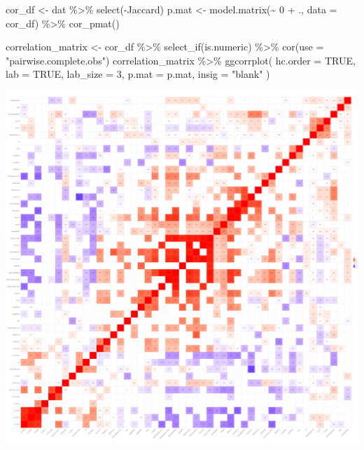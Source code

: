 \documentclass[
  letterpaper,
  DIV=11,
  numbers=noendperiod]{scrartcl}
\newenvironment{Shaded}{\begin{snugshade}}{\end{snugshade}}
\newcommand{\AttributeTok}[1]{\textcolor[rgb]{0.40,0.45,0.13}{#1}}
\newcommand{\ConstantTok}[1]{\textcolor[rgb]{0.56,0.35,0.01}{#1}}
\newcommand{\DecValTok}[1]{\textcolor[rgb]{0.68,0.00,0.00}{#1}}
\newcommand{\FunctionTok}[1]{\textcolor[rgb]{0.28,0.35,0.67}{#1}}
\newcommand{\NormalTok}[1]{\textcolor[rgb]{0.00,0.23,0.31}{#1}}
\newcommand{\OtherTok}[1]{\textcolor[rgb]{0.00,0.23,0.31}{#1}}
\newcommand{\SpecialCharTok}[1]{\textcolor[rgb]{0.37,0.37,0.37}{#1}}
\newcommand{\StringTok}[1]{\textcolor[rgb]{0.13,0.47,0.30}{#1}}
\begin{document}
\begin{Shaded}
\begin{Highlighting}[]
\NormalTok{cor\_df }\OtherTok{\textless{}{-}}\NormalTok{ dat }\SpecialCharTok{\%\textgreater{}\%} \FunctionTok{select}\NormalTok{(}\SpecialCharTok{{-}}\NormalTok{Jaccard)}
\NormalTok{p.mat }\OtherTok{\textless{}{-}} \FunctionTok{model.matrix}\NormalTok{(}\SpecialCharTok{\textasciitilde{}} \DecValTok{0} \SpecialCharTok{+}\NormalTok{ ., }\AttributeTok{data =}\NormalTok{ cor\_df) }\SpecialCharTok{\%\textgreater{}\%}
    \FunctionTok{cor\_pmat}\NormalTok{()}

\NormalTok{correlation\_matrix }\OtherTok{\textless{}{-}}\NormalTok{ cor\_df }\SpecialCharTok{\%\textgreater{}\%}
    \FunctionTok{select\_if}\NormalTok{(is.numeric) }\SpecialCharTok{\%\textgreater{}\%}
    \FunctionTok{cor}\NormalTok{(}\AttributeTok{use =} \StringTok{"pairwise.complete.obs"}\NormalTok{)}
\NormalTok{correlation\_matrix }\SpecialCharTok{\%\textgreater{}\%}
    \FunctionTok{ggcorrplot}\NormalTok{(}
        \AttributeTok{hc.order =} \ConstantTok{TRUE}\NormalTok{,}
        \AttributeTok{lab =} \ConstantTok{TRUE}\NormalTok{,}
        \AttributeTok{lab\_size =} \DecValTok{3}\NormalTok{,}
        \AttributeTok{p.mat =}\NormalTok{ p.mat,}
        \AttributeTok{insig =} \StringTok{"blank"}
\NormalTok{    )}
\end{Highlighting}
\end{Shaded}

\includegraphics{MachineLearning_StaticPatterNN_Report_files/figure-pdf/correlation-matrix-1.pdf}
\end{document}
